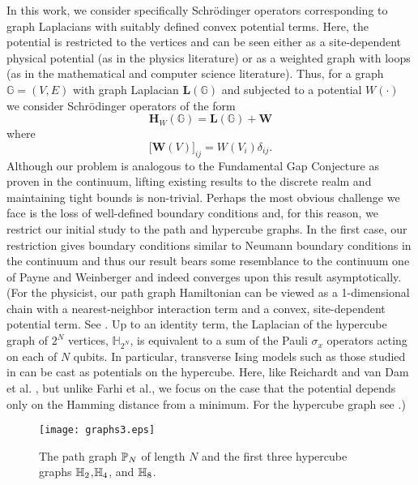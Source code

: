   In this work, we consider specifically Schr\"{o}dinger operators corresponding to graph Laplacians with suitably defined convex potential terms. Here, the potential is restricted to the vertices and can be seen either as a site-dependent physical potential (as in the physics literature) or as a weighted graph with loops (as in the mathematical and computer science literature). Thus, for a graph $\mathbb{G}=(V,E)$ with graph Laplacian $\mathbf{L(\mathbb{G})}$ and subjected to a potential $W(\cdot)$ we consider Schr\"{o}dinger operators of the form
  \begin{equation}
    \mathbf{H}_{W}(\mathbb{G}) = \mathbf{L(\mathbb{G})} + \mathbf{W}
  \end{equation}
  where
  \begin{equation}
    \big[\mathbf{W}(V)\big]_{ij} = W(V_i) \delta_{ij}.
  \end{equation}
  Although our problem is analogous to the Fundamental Gap Conjecture as proven in the continuum, lifting existing results to the discrete realm and maintaining tight bounds is non-trivial. Perhaps the most obvious challenge we face is the loss of well-defined boundary conditions and, for this reason, we restrict our initial study to the path and hypercube graphs. In the first case, our restriction gives boundary conditions similar to Neumann boundary conditions in the continuum and thus our result bears some resemblance to the continuum one of Payne and Weinberger \cite{Payne1960} and indeed converges upon this result asymptotically. (For the physicist, our path graph Hamiltonian can be viewed as a 1-dimensional chain with a nearest-neighbor interaction term and a convex, site-dependent potential term. See . Up to an identity term, the Laplacian of the hypercube graph of $2^N$ vertices,  $\mathbb{H}_{2^N}$, is equivalent to a sum of the Pauli $\sigma_x$ operators acting on each of $N$ qubits. In particular, transverse Ising models such as those studied in \cite{Farhi_science} can be cast as potentials on the hypercube. Here, like Reichardt\cite{R04} and van Dam et al. \cite{DMV01}, but unlike Farhi et al.\cite{Farhi_science}, we focus on the case that the potential depends only on the Hamming distance from a minimum. For the hypercube graph see .)
  
  \begin{figure}[htp]
    \texttt{[image: graphs3.eps]}
    \caption{\label{fig:path} The path graph $\mathbb{P}_{N}$ of length $N$ and the first three hypercube graphs $\mathbb{H}_{2}$,$\mathbb{H}_{4}$, and $\mathbb{H}_{8}$.}
  \end{figure}

